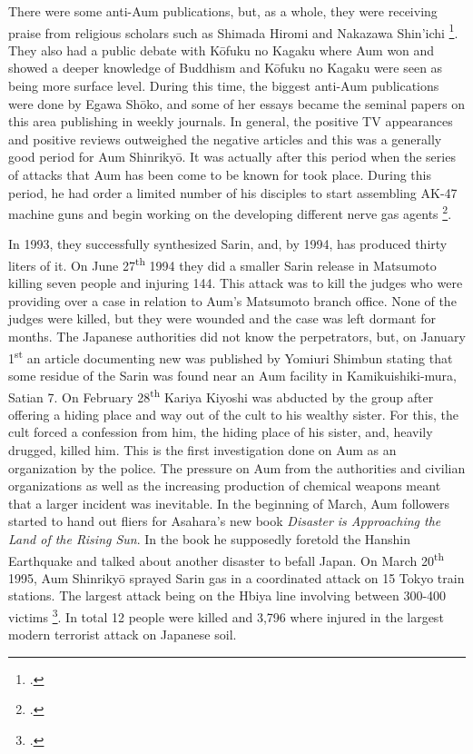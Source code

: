 \documentclass[12pt, letterpaper]{article}
\newcommand{\poses}[1]{#1's}
\begin{document}
There were some anti-Aum publications, but, as a
whole, they were receiving praise from religious scholars such as Shimada Hiromi and Nakazawa Shin’ichi
\footcite[38]{watanabe_reactions_1997}. They also had a public debate with K\=ofuku no Kagaku where Aum won
and showed a deeper knowledge of Buddhism and K\=ofuku no Kagaku were seen as being more surface level.
During this time, the biggest anti-Aum publications were done by Egawa Sh\=oko, and some of her essays
became the seminal papers on this area publishing in weekly journals. In general, the positive TV appearances
and positive reviews outweighed the negative articles and this was a generally good period for Aum
Shinriky\=o. It was actually after this period when the series of attacks that Aum has been come to be known
for took place. During this period, he had order a limited number of his disciples to start assembling AK-47
machine guns and begin working on the developing different nerve gas agents
\footcite[91,92]{watanabe_religion_1998}.

In 1993, they successfully synthesized Sarin, and, by 1994, has
produced thirty liters of it. On June 27\textsuperscript{th} 1994 they did a smaller Sarin release in
Matsumoto killing seven people and injuring 144. This attack was to kill the judges who were providing over a
case in relation to \poses{Aum} Matsumoto branch office. None of the judges were killed, but they were 
wounded and the case was left dormant for months. The Japanese authorities did not know the perpetrators,
but, on January 1\textsuperscript{st} an article documenting new was published by Yomiuri Shimbun stating 
that some residue of the Sarin was found near an Aum facility in Kamikuishiki-mura, Satian 7. On February
28\textsuperscript{th} Kariya Kiyoshi was abducted by the group after offering a hiding place and way out of
the cult to his wealthy sister. For this, the cult forced a confession from him, the hiding place of his
sister, and, heavily drugged, killed him. This is the first investigation done on Aum as an organization by
the police. The pressure on Aum from the authorities and civilian organizations as well as the increasing
production of chemical weapons meant that a larger incident was inevitable. In the beginning of March, Aum
followers started to hand out fliers for \poses{Asahara} new book \textit{Disaster is Approaching the Land 
  of the Rising Sun}. In the book he supposedly foretold the Hanshin Earthquake and talked about another
disaster to befall Japan. On March 20\textsuperscript{th} 1995, Aum Shinriky\=o sprayed Sarin gas in a
coordinated attack on 15 Tokyo train stations. The largest attack being on the Hbiya line involving between
300-400 victims \footcite[513]{olson_aum_1999}. In total 12 people were killed and 3,796 where injured in the
largest modern terrorist attack on Japanese soil.
\end{document}
